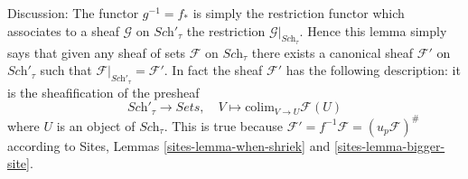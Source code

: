 \noindent
Discussion:
The functor $g^{-1} = f_*$ is simply the restriction functor which associates
to a sheaf $\mathcal{G}$ on $\textit{Sch}'_\tau$ the restriction
$\mathcal{G}|_{\textit{Sch}_\tau}$. Hence this lemma simply says that given
any sheaf of sets $\mathcal{F}$ on $\textit{Sch}_\tau$ there exists a
canonical sheaf $\mathcal{F}'$ on $\textit{Sch}'_\tau$ such that
$\mathcal{F}|_{\textit{Sch}'_\tau} = \mathcal{F}'$. In fact the sheaf
$\mathcal{F}'$ has the following description: it is the sheafification
of the presheaf
$$
\textit{Sch}'_\tau \longrightarrow \textit{Sets}, \quad
V \longmapsto \text{colim}_{V \to U} \mathcal{F}(U)
$$
where $U$ is an object of $\textit{Sch}_\tau$. This is true because
$\mathcal{F}' = f^{-1}\mathcal{F} = (u_p\mathcal{F})^\#$ according to
Sites, Lemmas \ref{sites-lemma-when-shriek} and \ref{sites-lemma-bigger-site}.









